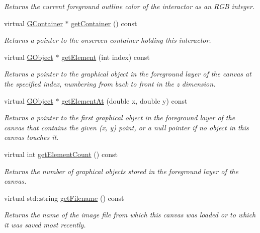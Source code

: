 \begin{DoxyCompactItemize}
\begin{DoxyCompactList}\small\item\em Returns the current foreground outline color of the interactor as an R\+GB integer. \end{DoxyCompactList}\item 
virtual \mbox{\hyperlink{classGContainer}{G\+Container}} $\ast$ \mbox{\hyperlink{classGInteractor_a7a6e317c29d61030929b4cd2d1c00fe7}{get\+Container}} () const
\begin{DoxyCompactList}\small\item\em Returns a pointer to the onscreen container holding this interactor. \end{DoxyCompactList}\item 
virtual \mbox{\hyperlink{classGObject}{G\+Object}} $\ast$ \mbox{\hyperlink{classGCanvas_abde388cc529d22bb5f7f4a54d56049d8}{get\+Element}} (int index) const
\begin{DoxyCompactList}\small\item\em Returns a pointer to the graphical object in the foreground layer of the canvas at the specified index, numbering from back to front in the {\itshape z} dimension. \end{DoxyCompactList}\item 
virtual \mbox{\hyperlink{classGObject}{G\+Object}} $\ast$ \mbox{\hyperlink{classGCanvas_a25efa999eca5790ec26ef091b05f961c}{get\+Element\+At}} (double x, double y) const
\begin{DoxyCompactList}\small\item\em Returns a pointer to the first graphical object in the foreground layer of the canvas that contains the given (x, y) point, or a null pointer if no object in this canvas touches it. \end{DoxyCompactList}\item 
virtual int \mbox{\hyperlink{classGCanvas_adf7d37ec315f859648def92e6b32408f}{get\+Element\+Count}} () const
\begin{DoxyCompactList}\small\item\em Returns the number of graphical objects stored in the foreground layer of the canvas. \end{DoxyCompactList}\item 
virtual std\+::string \mbox{\hyperlink{classGCanvas_a2011812670c3de9747702e3c052b6bb3}{get\+Filename}} () const
\begin{DoxyCompactList}\small\item\em Returns the name of the image file from which this canvas was loaded or to which it was saved most recently. \end{DoxyCompactList}\item 

\end{DoxyCompactItemize}
